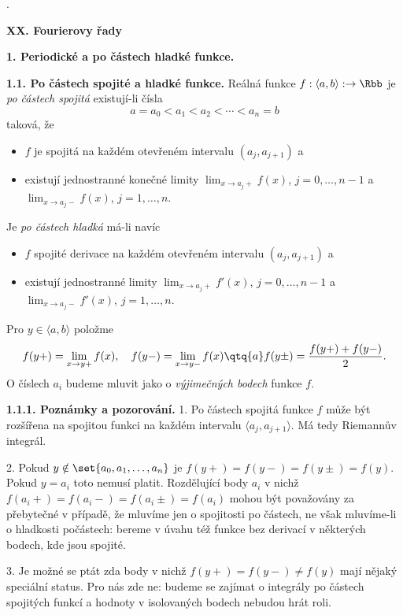 \documentclass[12pt]{article}
\begin{document}
 

 
 \newpage
.
 
  
\newpage 
 
  
 \centerline{\Large\bf XX. Fourierovy řady} 
 
 \vskip10mm
 
  
 {\large\bf 1. Periodické a po částech hladké funkce.}
 
 \bigskip
 
 {\bf 1.1. Po částech spojité a hladké funkce.} Reálná funkce $f:\langle a,b\rangle:\to\Rbb$ je {\em po částech spojitá} existují-li čísla
$$
a=a_0<a_1< a_2<\cdots <a_n=b
$$
taková, že
\begin{itemize}
\item $f$ je spojitá na každém otevřeném intervalu $(a_j,a_{j+1})$ a
\item existují jednostranné konečné limity $\lim_{x\to a_j+}f(x)$, $j=0,\dots,n-1$ a $\lim_{x\to a_j-}f(x)$, $j=1,\dots,n$.
\end{itemize}
Je {\em po částech hladká} má-li navíc
\begin{itemize}
\item $f$ spojité derivace na každém otevřeném intervalu  $(a_j,a_{j+1})$ a
\item existují jednostranné limity $\lim_{x\to a_j+}f'(x)$, $j=0,\dots,n-1$ a $\lim_{x\to a_j-}f'(x)$, $j=1,\dots,n$.
\end{itemize}
Pro $y\in\langle a,b\rangle$ položme
$$
f(y+)=\lim_{x\to y+}f(x),\quad f(y-)=\lim_{x\to y-}f(x)\qtq{a}
f(y\pm)=\frac{f(y+)+f(y-)}{2}.
$$
O číslech $a_i$ budeme mluvit jako o {\em výjimečných bodech} funkce  $f$.


\medskip

{\bf 1.1.1. Poznámky a pozorování.} 1. Po částech spojitá funkce
 $f$ může být rozšířena na spojitou funkci na každém intervalu $\langle a_j,a_{j+1}\rangle$. Má tedy Riemannův integrál.

2. Pokud $y\notin\set{a_0,a_1,\dots,a_n}$ je $f(y+)=f(y-)=f(y\pm)=f(y)$. Pokud $y=a_i$ toto nemusí platit. Rozdělující body $a_i$ v nichž
$f(a_i+)=f(a_i-)=f(a_i\pm)=f(a_i)$ mohou být považovány za přebytečné v případě, že mluvíme jen o spojitosti po částech, ne však mluvíme-li o hladkosti počástech: bereme v úvahu též funkce bez derivací v některých bodech, kde jsou spojité.

3. Je možné se ptát zda body v nichž $f(y+)=f(y-)\neq f(y)$ mají nějaký speciální status. Pro nás zde ne: budeme se zajímat o integrály po částech spojitých funkcí a hodnoty v isolovaných bodech nebudou hrát roli. 
\end{document}
